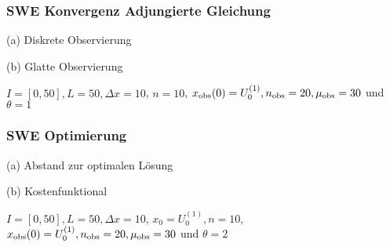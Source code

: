 % 
% 

\begin{frame}[<+->]
\frametitle{SWE Konvergenz Adjungierte Gleichung}
\begin{minipage}[b]{0.49\linewidth}
\centering

(a) Diskrete Observierung
\end{minipage}
\begin{minipage}[b]{0.49\linewidth}
\centering

(b) Glatte Observierung
\end{minipage}
\centering
$I=[0,50],L=50,\Delta x=10$, $n=10$, $x_\text{obs}(0) = U_0^{(1)}, n_{\text{obs}}=20,\mu_{\text{obs}}=30$ und $\theta=1$
\end{frame}

\begin{frame}[<+->]
\frametitle{SWE Optimierung}
\centering
\begin{minipage}[b]{0.49\linewidth}
 \centering

(a) Abstand zur optimalen Lösung
\end{minipage}
\begin{minipage}[b]{0.49\linewidth}
 \centering

(b) Kostenfunktional
\end{minipage}
$I=[0,50],L=50,\Delta x=10$, $x_0=U_0^{(1)},n=10$, $x_\text{obs}(0) = U_0^{(1)}, n_{\text{obs}}=20,\mu_{\text{obs}}=30$ und $\theta=2$

\end{frame}
